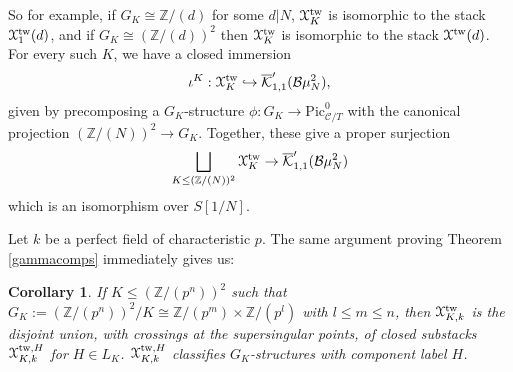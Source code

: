 \documentclass[11pt]{amsart}
\newtheorem{corollary}[subsection]{Corollary}
\theoremstyle{definition}
\begin{document}
So for example, if $G_K \cong \mathbb{Z}/(d)$ for some $d|N$, ${\mathbf{\EuScript{X}}}^{\mathrm{tw}}_K$ is isomorphic to the stack ${\mathbf{\EuScript{X}}}^{\mathrm{tw}}_1(d)$, and if $G_K \cong (\mathbb{Z}/(d))^2$ then ${\mathbf{\EuScript{X}}}^{\mathrm{tw}}_K$ is isomorphic to the stack ${\mathbf{\EuScript{X}}}^{\mathrm{tw}}(d)$. For every such $K$, we have a closed immersion 
\begin{displaymath}
\iota^K: {\mathbf{\EuScript{X}}}^{\mathrm{tw}}_K  \hookrightarrow \overline{\mathcal{K}}'_{1,1}( {\mathcal{B}} \mu_N^2), 
\end{displaymath}
given by precomposing a $G_K$-structure $\phi:G_K \rightarrow \mathrm{Pic}^0_{{\mathcal{C}}/T}$ with the canonical projection $(\mathbb{Z}/(N))^2 \rightarrow G_K$. Together, these give a proper surjection 
\begin{displaymath}
\bigsqcup_{K \leq (\mathbb{Z}/(N))^2} {\mathbf{\EuScript{X}}}^{\mathrm{tw}}_K \rightarrow \overline{\mathcal{K}}'_{1,1}({\mathcal{B}}\mu_N^2)
\end{displaymath}
which is an isomorphism over $S[1/N]$.

Let $k$ be a perfect field of characteristic $p$. The same argument proving Theorem \ref{gammacomps} immediately gives us:

\begin{corollary}
If $K \leq (\mathbb{Z}/(p^n))^2$ such that $G_K := (\mathbb{Z}/(p^n))^2/K \cong \mathbb{Z}/(p^m) \times \mathbb{Z}/(p^l)$ with $l\leq m \leq n$, then ${\mathbf{\EuScript{X}}}^{\mathrm{tw}}_{K,k}$ is the disjoint union, with crossings at the supersingular points, of closed substacks ${\mathbf{\EuScript{X}}}^{\mathrm{tw},H}_{K,k}$ for $H \in L_K$. ${\mathbf{\EuScript{X}}}^{\mathrm{tw},H}_{K,k}$ classifies $G_K$-structures with component label $H$. 
\end{corollary}
\end{document}
